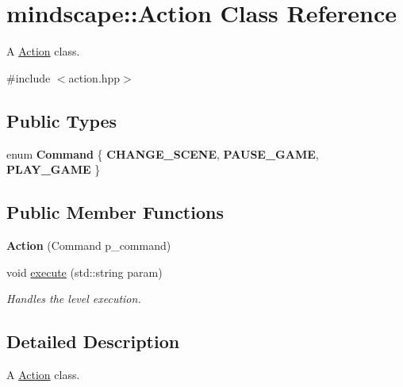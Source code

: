 \hypertarget{classmindscape_1_1_action}{}\section{mindscape\+:\+:Action Class Reference}
\label{classmindscape_1_1_action}


A \hyperlink{classmindscape_1_1_action}{Action} class.  




{\ttfamily \#include $<$action.\+hpp$>$}

\subsection*{Public Types}
\begin{DoxyCompactItemize}
\item 
enum {\bfseries Command} \{ {\bfseries C\+H\+A\+N\+G\+E\+\_\+\+S\+C\+E\+NE}, 
{\bfseries P\+A\+U\+S\+E\+\_\+\+G\+A\+ME}, 
{\bfseries P\+L\+A\+Y\+\_\+\+G\+A\+ME}
 \}\hypertarget{classmindscape_1_1_action_a799877bede87f249b2130a4ec3eefcf4}{}\label{classmindscape_1_1_action_a799877bede87f249b2130a4ec3eefcf4}

\end{DoxyCompactItemize}
\subsection*{Public Member Functions}
\begin{DoxyCompactItemize}
\item 
{\bfseries Action} (Command p\+\_\+command)\hypertarget{classmindscape_1_1_action_a15bc9dff5d0e39a84e0482ed5a018af4}{}\label{classmindscape_1_1_action_a15bc9dff5d0e39a84e0482ed5a018af4}

\item 
void \hyperlink{classmindscape_1_1_action_a825be60d061bdd84b879a537132406bc}{execute} (std\+::string param)
\begin{DoxyCompactList}\small\item\em Handles the level execution. \end{DoxyCompactList}\end{DoxyCompactItemize}


\subsection{Detailed Description}
A \hyperlink{classmindscape_1_1_action}{Action} class. 

